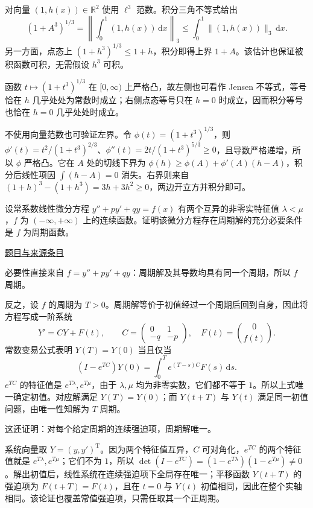 \documentclass[UTF8,12pt,a4paper,fontset=fandol]{ctexart}
\begin{document}
\begin{solve}\label{ans:fin17-high:8}

对向量 $(1,h(x))\in\mathbb R^2$ 使用 $\ell^3$ 范数。积分三角不等式给出
\[
(1+A^3)^{1/3}
=\left\|\int_0^1(1,h(x))\,\mathrm dx\right\|_3
\le\int_0^1\|(1,h(x))\|_3\,\mathrm dx.
\]
另一方面，点态上 $(1+h^3)^{1/3}\le1+h$，积分即得上界 $1+A$。该估计也保证被积函数可积，无需假设 $h^3$ 可积。

函数 $t\mapsto(1+t^3)^{1/3}$ 在 $[0,\infty)$ 上严格凸，故左侧也可看作 Jensen 不等式，等号恰在 $h$ 几乎处处为常数时成立；右侧点态等号只在 $h=0$ 时成立，因而积分等号也恰在 $h=0$ 几乎处处时成立。

不使用向量范数也可验证左界。令 $\phi(t)=(1+t^3)^{1/3}$，则 $\phi'(t)=t^2/(1+t^3)^{2/3}$、$\phi''(t)=2t/(1+t^3)^{5/3}\ge0$，且导数严格递增，所以 $\phi$ 严格凸。它在 $A$ 处的切线下界为 $\phi(h)\ge\phi(A)+\phi'(A)(h-A)$，积分后线性项因 $\int(h-A)=0$ 消失。右界则来自 $(1+h)^3-(1+h^3)=3h+3h^2\ge0$，两边开立方并积分即可。

\end{solve}

\begin{example}\label{ex:fin17-low:10}\label{pr:fin17-low:10}

设常系数线性微分方程 $y''+py'+qy=f(x)$ 有两个互异的非零实特征值 $\lambda<\mu$，$f$ 为 $(-\infty,+\infty)$ 上的连续函数。证明该微分方程存在周期解的充分必要条件是 $f$ 为周期函数。

\par\href{https://github.com/lzxcr/cmc-mathematics/blob/64916fa1fdbc3e444a652eca204d5669058ee321/src/problems/finals/17/12.md}{题目与来源条目}

\end{example}

\begin{solve}\label{ans:fin17-low:10}

必要性直接来自 $f=y''+py'+qy$：周期解及其导数均具有同一个周期，所以 $f$ 周期。

反之，设 $f$ 的周期为 $T>0$。周期解等价于初值经过一个周期后回到自身，因此将方程写成一阶系统
\[
Y'=CY+F(t),\qquad C=\begin{pmatrix}0&1\\-q&-p\end{pmatrix},\quad
F(t)=\binom0{f(t)}.
\]
常数变易公式表明 $Y(T)=Y(0)$ 当且仅当
\[
(I-e^{TC})Y(0)=\int_0^Te^{(T-s)C}F(s)\,\mathrm ds.
\]
$e^{TC}$ 的特征值是 $e^{T\lambda},e^{T\mu}$，由于 $\lambda,\mu$ 均为非零实数，它们都不等于 $1$。所以上式唯一确定初值。对应解满足 $Y(T)=Y(0)$；而 $Y(t+T)$ 与 $Y(t)$ 满足同一初值问题，由唯一性知解为 $T$ 周期。

这还证明：对每个给定周期的连续强迫项，周期解唯一。

系统向量取 $Y=(y,y')^{\mathrm T}$。因为两个特征值互异，$C$ 可对角化，$e^{TC}$ 的两个特征值就是 $e^{T\lambda},e^{T\mu}$；它们不为 $1$，所以 $\det(I-e^{TC})=(1-e^{T\lambda})(1-e^{T\mu})\ne0$。解出初值后，线性系统在连续强迫项下全局存在唯一；平移函数 $Y(t+T)$ 的强迫项为 $F(t+T)=F(t)$，且在 $t=0$ 与 $Y(t)$ 初值相同，因此在整个实轴相同。该论证也覆盖常值强迫项，只需任取其一个正周期。

\end{solve}
\end{document}

